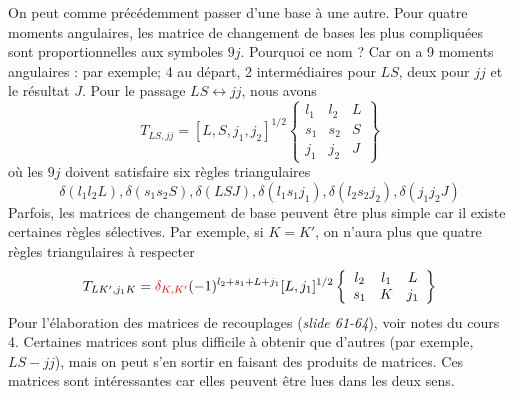 On peut comme précédemment passer d'une base à une autre. Pour quatre moments angulaires,
les matrice de changement de bases les plus compliquées sont proportionnelles aux symboles
$9j$. Pourquoi ce nom ? Car on a 9 moments angulaires : par exemple; 4 au départ, 
2 intermédiaires pour $LS$, deux pour $jj$ et le résultat $J$. Pour le passage $LS\leftrightarrow
jj$, nous avons
\begin{equation}
T_{LS,jj} = [L,S,j_1,j_2]^{1/2}
\left\{ \begin{array}{ccc}
l_1  & l_2 & L \\ s_1 & s_2 & S \\
j_1 & j_2 & J \end{array} 
\right\}
\end{equation}
où les $9j$ doivent satisfaire six règles triangulaires
\begin{equation}
\delta(l_1 l_2  L) , 
\delta(s_1 s_2  S) ,
\delta(L S J),
\delta(l_1 s_1 j_1) ,
\delta(l_2 s_2  j_2) ,
\delta(j_1 j_2  J)
\end{equation}
Parfois, les matrices de changement de base peuvent être plus simple car il existe
certaines règles sélectives. Par exemple, si $K=K'$, on n'aura plus que quatre règles
triangulaires à respecter
\begin{equation}
T_{LK',j_1 K} = 
{\color{red} \delta_{K,K'}}
(-1)^{l_2 + s_1 +L + j_1} 
[L, j_1]^{1/2}
\left\{ \begin{array}{ccc}
l_2  & l_1 & L \\ s_1 & K & j_1  \end{array} 
\right\}
\end{equation}
Pour l'élaboration des matrices de recouplages (\textit{slide 61-64}), voir notes du
cours 4. Certaines matrices sont plus difficile à obtenir que d'autres (par exemple,
$LS-jj$), mais on peut s'en sortir en faisant des produits de matrices. Ces matrices
sont intéressantes car elles peuvent être lues dans les deux sens.

